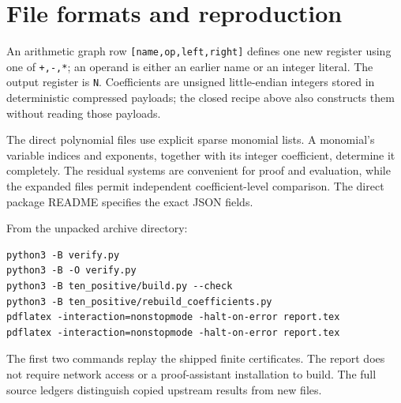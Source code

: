 \documentclass[11pt]{article}
\theoremstyle{remark}\newtheorem{remark}[theorem]{Remark}
\begin{document}


\section{File formats and reproduction}

An arithmetic graph row \texttt{[name,op,left,right]} defines one new
register using one of \texttt{+,-,*}; an operand is either an earlier name or
an integer literal. The output register is \texttt{N}. Coefficients are
unsigned little-endian integers stored in deterministic compressed payloads;
the closed recipe above also constructs them without reading those payloads.

The direct polynomial files use explicit sparse monomial lists. A monomial's
variable indices and exponents, together with its integer coefficient,
determine it completely. The residual systems are convenient for proof and
evaluation, while the expanded files permit independent coefficient-level
comparison. The direct package README specifies the exact JSON fields.

From the unpacked archive directory:
\begin{verbatim}
python3 -B verify.py
python3 -B -O verify.py
python3 -B ten_positive/build.py --check
python3 -B ten_positive/rebuild_coefficients.py
pdflatex -interaction=nonstopmode -halt-on-error report.tex
pdflatex -interaction=nonstopmode -halt-on-error report.tex
\end{verbatim}
The first two commands replay the shipped finite certificates. The report
does not require network access or a proof-assistant installation to build.
The full source ledgers distinguish copied upstream results from new files.
\end{document}
